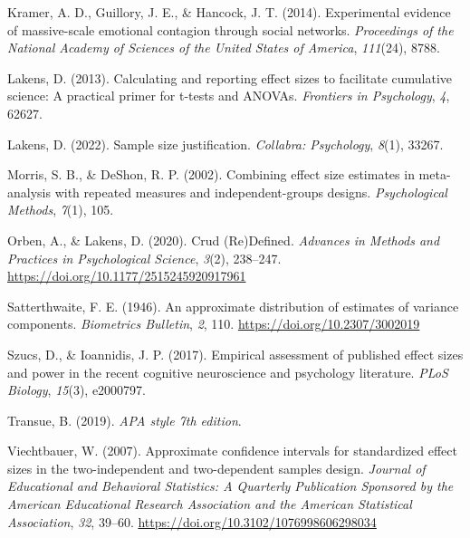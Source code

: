 \documentclass[
  man]{apa7}
\newlength{\cslhangindent}
\newlength{\cslentryspacingunit} %
\newenvironment{CSLReferences}[2] %
 {%
  \setlength{\parindent}{0pt}
  \ifodd #1
  \let\oldpar\par
  \def\par{\hangindent=\cslhangindent\oldpar}
  \fi
  \setlength{\parskip}{#2\cslentryspacingunit}
 }%
 {}
\begin{document}
\begin{CSLReferences}{1}{0}
\leavevmode{}%
Kramer, A. D., Guillory, J. E., \& Hancock, J. T. (2014). Experimental evidence of massive-scale emotional contagion through social networks. \emph{Proceedings of the National Academy of Sciences of the United States of America}, \emph{111}(24), 8788.

\leavevmode{}%
Lakens, D. (2013). Calculating and reporting effect sizes to facilitate cumulative science: A practical primer for t-tests and ANOVAs. \emph{Frontiers in Psychology}, \emph{4}, 62627.

\leavevmode{}%
Lakens, D. (2022). Sample size justification. \emph{Collabra: Psychology}, \emph{8}(1), 33267.

\leavevmode{}%
Morris, S. B., \& DeShon, R. P. (2002). Combining effect size estimates in meta-analysis with repeated measures and independent-groups designs. \emph{Psychological Methods}, \emph{7}(1), 105.

\leavevmode{}%
Orben, A., \& Lakens, D. (2020). Crud ({Re}){Defined}. \emph{Advances in Methods and Practices in Psychological Science}, \emph{3}(2), 238--247. \url{https://doi.org/10.1177/2515245920917961}

\leavevmode{}%
Satterthwaite, F. E. (1946). An approximate distribution of estimates of variance components. \emph{Biometrics Bulletin}, \emph{2}, 110. \url{https://doi.org/10.2307/3002019}

\leavevmode{}%
Szucs, D., \& Ioannidis, J. P. (2017). Empirical assessment of published effect sizes and power in the recent cognitive neuroscience and psychology literature. \emph{PLoS Biology}, \emph{15}(3), e2000797.

\leavevmode{}%
Transue, B. (2019). \emph{APA style 7th edition}.

\leavevmode{}%
Viechtbauer, W. (2007). Approximate confidence intervals for standardized effect sizes in the two-independent and two-dependent samples design. \emph{Journal of Educational and Behavioral Statistics: A Quarterly Publication Sponsored by the American Educational Research Association and the American Statistical Association}, \emph{32}, 39--60. \url{https://doi.org/10.3102/1076998606298034}


\end{CSLReferences}
\end{document}
